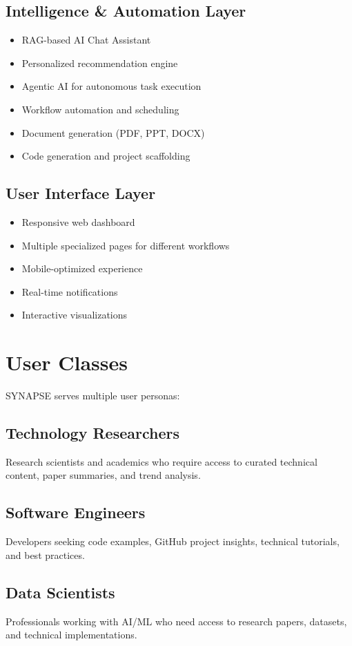 \documentclass{report}
\begin{document}
\subsection{Intelligence \& Automation Layer}
\begin{itemize}
    \item RAG-based AI Chat Assistant
    \item Personalized recommendation engine
    \item Agentic AI for autonomous task execution
    \item Workflow automation and scheduling
    \item Document generation (PDF, PPT, DOCX)
    \item Code generation and project scaffolding
\end{itemize}

\subsection{User Interface Layer}
\begin{itemize}
    \item Responsive web dashboard
    \item Multiple specialized pages for different workflows
    \item Mobile-optimized experience
    \item Real-time notifications
    \item Interactive visualizations
\end{itemize}

\section{User Classes}
SYNAPSE serves multiple user personas:

\subsection{Technology Researchers}
Research scientists and academics who require access to curated technical content, paper summaries, and trend analysis.

\subsection{Software Engineers}
Developers seeking code examples, GitHub project insights, technical tutorials, and best practices.

\subsection{Data Scientists}
Professionals working with AI/ML who need access to research papers, datasets, and technical implementations.
\end{document}
